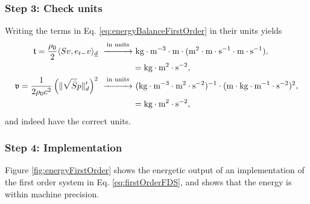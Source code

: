 {\subsubsection{Step 3: Check units}
Writing the terms in Eq. \eqref{eq:energyBalanceFirstOrder} in their units yields
\begin{align*}
    \t = \frac{\rho_0}{2}\langle Sv, e_{t-}v\rangle_{\underline{d}}\ \overset{\text{in units}}{\xrightarrow{\hspace*{1cm}}}& \ \text{kg}\cdot \text{m}^{-3}\cdot \text{m} \cdot (\text{m}^2 \cdot \text{m}\cdot\text{s}^{-1} \cdot \text{m}\cdot\text{s}^{-1}),\\
    & = \text{kg} \cdot \text{m}^2 \cdot \text{s}^{-2},\\
    \v = \frac{1}{2\rho_0 c^2}\left(\lVert\sqrt{\bar S }p\rVert'_d\right)^2\ \overset{\text{in units}}{\xrightarrow{\hspace*{1cm}}}&\  (\text{kg} \cdot \text{m}^{-3} \cdot \text{m}^2 \cdot \text{s}^{-2})^{-1} \cdot(\text{m} \cdot \text{kg} \cdot \text{m}^{-1}\cdot \text{s}^{-2})^2,\\
    &= \text{kg} \cdot \text{m}^2 \cdot \text{s}^{-2},
\end{align*}
and indeed have the correct units.
\subsubsection{Step 4: Implementation}
Figure \ref{fig:energyFirstOrder} shows the energetic output of an implementation of the first order system in Eq. \eqref{eq:firstOrderFDS}, and shows that the energy is within machine precision.

\begin{figure}[h]
    \centering
\end{figure}}
